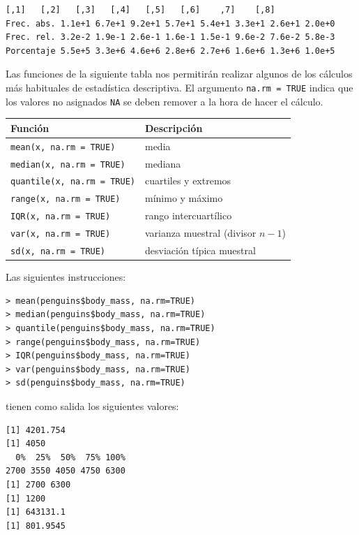 \documentclass[11pt,a4paper]{article}
\theoremstyle{exercise}
\begin{document}
\begin{lstlisting}[style=routput]
             [,1]   [,2]   [,3]   [,4]   [,5]   [,6]    ,7]    [,8]
Frec. abs. 1.1e+1 6.7e+1 9.2e+1 5.7e+1 5.4e+1 3.3e+1 2.6e+1 2.0e+0
Frec. rel. 3.2e-2 1.9e-1 2.6e-1 1.6e-1 1.5e-1 9.6e-2 7.6e-2 5.8e-3
Porcentaje 5.5e+5 3.3e+6 4.6e+6 2.8e+6 2.7e+6 1.6e+6 1.3e+6 1.0e+5
\end{lstlisting}



Las funciones de la siguiente tabla nos permitirán realizar algunos de los cálculos más habituales de estadística descriptiva. El argumento \texttt{na.rm = TRUE} indica que los valores no asignados \texttt{NA} se deben remover a la hora de hacer el cálculo.

\begin{center}
	\begin{tabular}{|l|l|} \hline
		\textbf{Función} & \textbf{Descripción} \\ \hline	
		\texttt{mean(x, na.rm = TRUE)}     & media \\
		\texttt{median(x, na.rm = TRUE)}   & mediana \\
		\texttt{quantile(x, na.rm = TRUE)} & cuartiles y extremos \\
		\texttt{range(x, na.rm = TRUE)}    & mínimo y máximo \\
		\texttt{IQR(x, na.rm = TRUE)}      & rango intercuartílico \\
		\texttt{var(x, na.rm = TRUE)}      & varianza muestral (divisor $n-1$) \\
		\texttt{sd(x, na.rm = TRUE)}       & desviación típica muestral \\ \hline
	\end{tabular}
\end{center}

Las siguientes instrucciones:
\begin{lstlisting}[style=rconsole]
> mean(penguins$body_mass, na.rm=TRUE)
> median(penguins$body_mass, na.rm=TRUE)
> quantile(penguins$body_mass, na.rm=TRUE)
> range(penguins$body_mass, na.rm=TRUE)
> IQR(penguins$body_mass, na.rm=TRUE)
> var(penguins$body_mass, na.rm=TRUE)
> sd(penguins$body_mass, na.rm=TRUE)
\end{lstlisting}
tienen como salida los siguientes valores:
\begin{lstlisting}[style=routput]
[1] 4201.754
[1] 4050
  0%  25%  50%  75% 100% 
2700 3550 4050 4750 6300 
[1] 2700 6300
[1] 1200
[1] 643131.1
[1] 801.9545
\end{lstlisting}
\end{document}
